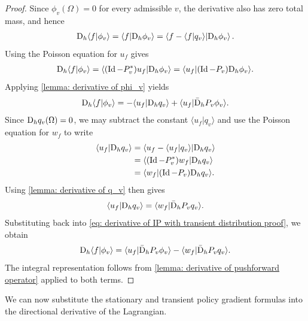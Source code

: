 \documentclass[twoside,10pt]{../jmlr}
\begin{document}
\begin{proof}
    Since $\phi_v(\Omega)=0$ for every admissible $v$, the derivative also has zero total mass, and hence
    \begin{align}
        \mathrm{D}_h\langle f\vert \phi_v\rangle
        =\langle f\vert \mathrm{D}_h\phi_v\rangle
        =\left\langle f-\langle f\vert q_v\rangle\middle\vert \mathrm{D}_h\phi_v\right\rangle.
    \end{align}
    Using the Poisson equation for $u_f$ gives
    \begin{align}
        \mathrm{D}_h\langle f\vert \phi_v\rangle
        =\langle (\operatorname{Id}-P_v^*)u_f\vert \mathrm{D}_h\phi_v\rangle
        =\langle u_f\vert (\operatorname{Id}-P_v)\mathrm{D}_h\phi_v\rangle.
    \end{align}
    Applying \cref{lemma: derivative of phi_v} yields
    \begin{align}
        \mathrm{D}_h\langle f\vert \phi_v\rangle
        =-\langle u_f\vert \mathrm{D}_h q_v\rangle+\langle u_f\vert \bar{\mathrm{D}}_h P_v\phi_v\rangle. \label{eq: derivative of IP with transient distribution proof}
    \end{align}
    Since $\mathrm{D}_h q_v(\Omega)=0$, we may subtract the constant $\langle u_f\vert q_v\rangle$ and use the Poisson equation for $w_f$ to write
    \begin{align}
        \langle u_f\vert \mathrm{D}_h q_v\rangle
        &=\left\langle u_f-\langle u_f\vert q_v\rangle\middle\vert \mathrm{D}_h q_v\right\rangle\\
        &=\langle (\operatorname{Id}-P_v^*)w_f\vert \mathrm{D}_h q_v\rangle\\
        &=\langle w_f\vert (\operatorname{Id}-P_v)\mathrm{D}_h q_v\rangle.
    \end{align}
    Using \cref{lemma: derivative of q_v} then gives
    \begin{align}
        \langle u_f\vert \mathrm{D}_h q_v\rangle=\langle w_f\vert \bar{\mathrm{D}}_h P_v q_v\rangle.
    \end{align}
    Substituting back into \eqref{eq: derivative of IP with transient distribution proof}, we obtain
    \begin{align}
        \mathrm{D}_h\langle f\vert \phi_v\rangle
        =\langle u_f\vert \bar{\mathrm{D}}_h P_v\phi_v\rangle-\langle w_f\vert \bar{\mathrm{D}}_h P_v q_v\rangle.
    \end{align}
    The integral representation follows from \cref{lemma: derivative of pushforward operator} applied to both terms.
\end{proof}

We can now substitute the stationary and transient policy gradient formulas into the directional derivative of the Lagrangian.
\end{document}

